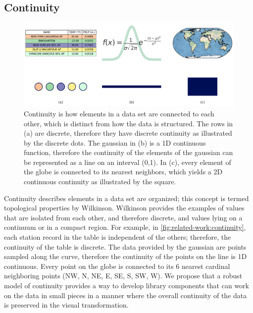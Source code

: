\documentclass[10pt,journal,compsoc]{IEEEtran}
\theoremstyle{definition}
\theoremstyle{remark}
\begin{document}
\subsection{Continuity}
\begin{figure}[!h]
  \includegraphics[width=\columnwidth]{k_different_types.png}
  \caption{Continuity is how elements in a data set are connected to each other, which is distinct from how the data is structured. The rows in (a) are discrete, therefore they have discrete continuity as illustrated by the discrete dots. The gaussian in (b) is a 1D continuous function, therefore the continuity of the elements of the gaussian can be represented as a line on an interval (0,1). In (c), every element of the globe is connected to its nearest neighbors, which yields a 2D continuous continuity as illustrated by the square.}
  \label{fig:related-work:continuity}
\end{figure}
Continuity describes elements in a data set are organized; this concept is termed topological properties by Wilkinson\cite{wilkinsonGrammarGraphics2005}. Wilkinson provides the examples of values that are isolated from each other, and therefore discrete, and values lying on a continuum or in a compact region. For example, in \autoref{fig:related-work:continuity}, each station record in the table is independent of the others; therefore, the continuity of the table is discrete. The data provided by the gaussian are points sampled along the curve, therefore the continuity of the points on the line is 1D continuous. Every point on the globe is connected to its 6 nearest cardinal neighboring points (NW, N, NE, E, SE, S, SW, W). We propose that a robust model of continuity provides a way to develop library components that can work on the data in small pieces in a manner where the overall continuity of the data is preserved in the visual transformation. 
\end{document}
